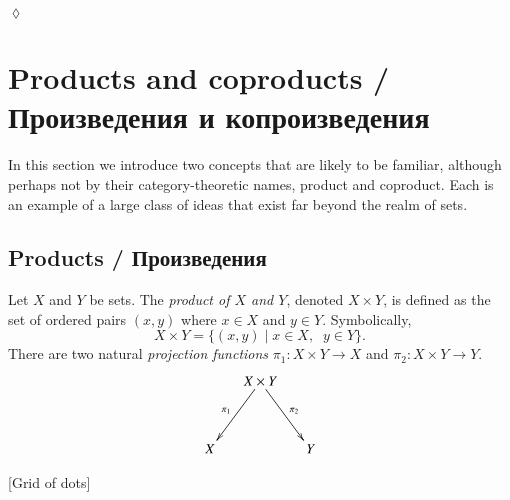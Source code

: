 \documentclass{book}
\def\to{\rightarrow}
\def\taking{\colon}
\def\|{{\;|\;}}
\theoremstyle{theoremENG}
\theoremstyle{lemmaENG}
\theoremstyle{propositionENG}
\theoremstyle{corollaryENG}
\theoremstyle{factENG}
\theoremstyle{remarkENG}
\theoremstyle{exampleENG}
\newtheorem{exampleENG}[subsubsection]{\begin{english}Example\end{english}}
\theoremstyle{warningENG}
\theoremstyle{questionENG}
\theoremstyle{guessENG}
\theoremstyle{answerENG}
\theoremstyle{constructionENG}
\theoremstyle{rulesENG}
\theoremstyle{excENG}
\newtheorem{excENG}[subsubsection]{\begin{english}Exercise\end{english}}
\theoremstyle{appENG}
\theoremstyle{definitionENG}
\newtheorem{definitionENG}[subsubsection]{\begin{english}Definition\end{english}}
\theoremstyle{notationENG}
\theoremstyle{conjectureENG}
\theoremstyle{postulateENG}
\newenvironment{exerciseENG}{\begin{excENG}}{\hspace*{\fill}$\lozenge$\end{excENG}}
\theoremstyle{theoremRUS}
\theoremstyle{lemmaRUS}
\theoremstyle{propositionRUS}
\theoremstyle{corollaryRUS}
\theoremstyle{factRUS}
\theoremstyle{remarkRUS}
\theoremstyle{exampleRUS}
\theoremstyle{warningRUS}
\theoremstyle{questionRUS}
\theoremstyle{guessRUS}
\theoremstyle{answerRUS}
\theoremstyle{constructionRUS}
\theoremstyle{rulesRUS}
\theoremstyle{excRUS}
\theoremstyle{appRUS}
\theoremstyle{definitionRUS}
\theoremstyle{notationRUS}
\theoremstyle{conjectureRUS}
\theoremstyle{postulateRUS}
\begin{document}
\begin{english}
\begin{exerciseENG}
\end{exerciseENG}


\section{Products and coproducts / Произведения и копроизведения}\label{sec:prods and coprods in set}

In this section we introduce two concepts that are likely to be familiar, although perhaps not by their category-theoretic names, product and coproduct. Each is an example of a large class of ideas that exist far beyond the realm of sets.

\begin{russian} \end{russian}


\subsection{Products / Произведения}\label{sec:products}

\begin{definitionENG}

Let $X$ and $Y$ be sets. The {\em product of $X$ and $Y$}, denoted $X\times Y$, is defined as the set of ordered pairs $(x,y)$ where $x\in X$ and $y\in Y$. Symbolically, $$X\times Y=\{(x,y)\|x\in X,\;\; y\in Y\}.$$ There are two natural {\em projection functions} $\pi_1\taking X\times Y\to X$ and $\pi_2\taking X\times Y\to Y$.
$$\xymatrix@=15pt{&X\times Y\ar[ddr]^{\pi_2}\ar[ddl]_{\pi_1}\\\\X&&Y}$$

\begin{russian} \end{russian}

\end{definitionENG}

\begin{exampleENG}\label{ex:grid1}[Grid of dots]


\end{exampleENG}
\end{english}
\end{document}
